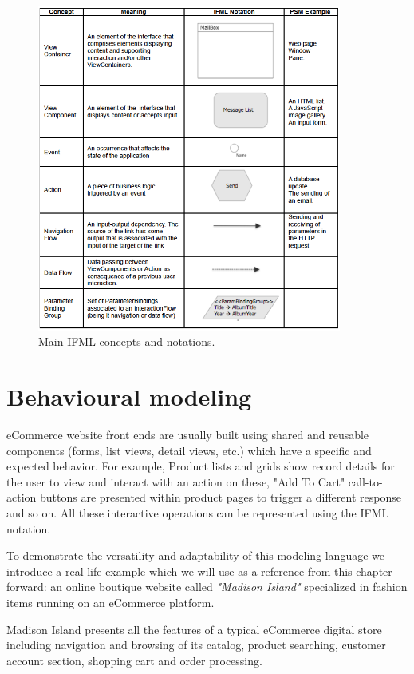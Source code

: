 \vspace{0.5cm}
\begin{figure}[htbp]
  \centering
    \includegraphics[width=10cm]{images/ifml.jpg}
  \caption{Main IFML concepts and notations.}
  \label{fig:ifml}
\end{figure}
\vspace{0.5cm}

\section{Behavioural modeling}

eCommerce website front ends are usually built using shared and reusable components (forms, list views, detail views, etc.) which have a specific and expected behavior.
For example, Product lists and grids show record details for the user to view and interact with an action on these, "Add To Cart" call-to-action buttons are presented within product pages to trigger a different response and so on.
All these interactive operations can be represented using the IFML notation.

To demonstrate the versatility and adaptability of this modeling language we introduce a real-life example which we will use as a reference from this chapter forward: an online boutique website called \textit{"Madison Island"} specialized in fashion items running on an eCommerce platform.

Madison Island presents all the features of a typical eCommerce digital store including navigation and browsing of its catalog, product searching, customer account section, shopping cart and order processing. 


